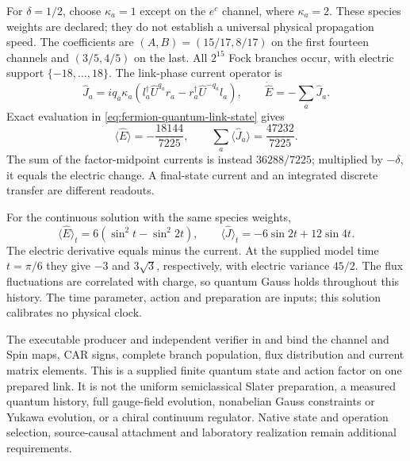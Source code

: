 For $\delta=1/2$, choose $\kappa_a=1$ except on the $e^c$ channel,
where $\kappa_a=2$. These species weights are declared; they do not
establish a universal physical propagation speed. The coefficients are
$(A,B)=(15/17,8/17)$ on the first fourteen channels and $(3/5,4/5)$ on
the last. All $2^{15}$ Fock branches occur, with electric support
$\{-18,\ldots,18\}$. The link-phase current operator is
\[
 \widehat J_a=iq_a\kappa_a
 \left(l_a^\dagger\widehat U^{q_a}r_a
       -r_a^\dagger\widehat U^{-q_a}l_a\right),
 \qquad \dot{\widehat E}=-\sum_a\widehat J_a.
\]
Exact evaluation in \eqref{eq:fermion-quantum-link-state} gives
\[
 \langle\widehat E\rangle=-\frac{18144}{7225},\qquad
 \sum_a\langle\widehat J_a\rangle=\frac{47232}{7225}.
\]
The sum of the factor-midpoint currents is instead $36288/7225$;
multiplied by $-\delta$, it equals the electric change. A final-state
current and an integrated discrete transfer are different readouts.

For the continuous solution with the same species weights,
\[
 \langle\widehat E\rangle_t=6(\sin^2t-\sin^2 2t),\qquad
 \langle\widehat J\rangle_t=-6\sin 2t+12\sin 4t.
\]
The electric derivative equals minus the current. At the supplied model
time $t=\pi/6$ they give $-3$ and $3\sqrt3$, respectively, with electric
variance $45/2$. The flux fluctuations are correlated with charge, so quantum Gauss
holds throughout this history. The time parameter, action and preparation
are inputs; this solution calibrates no physical clock.

The executable producer and independent verifier in
 and
 bind the channel and
Spin maps, CAR signs, complete branch population, flux distribution and
current matrix elements. This is a supplied finite quantum state and
action factor on one prepared link. It is not the uniform semiclassical
Slater preparation, a measured quantum history, full gauge-field
evolution, nonabelian Gauss constraints or Yukawa evolution, or a chiral continuum
regulator.
Native state and operation selection, source-causal attachment and
laboratory realization remain additional requirements.
